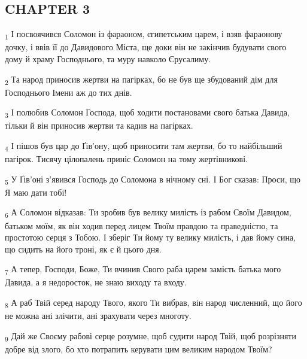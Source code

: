 \subsection{CHAPTER 3}
\begin{tcolorbox}
\textsubscript{1} І посвоячився Соломон із фараоном, єгипетським царем, і взяв фараонову дочку, і ввів її до Давидового Міста, ще доки він не закінчив будувати свого дому й храму Господнього, та муру навколо Єрусалиму.
\end{tcolorbox}
\begin{tcolorbox}
\textsubscript{2} Та народ приносив жертви на пагірках, бо не був ще збудований дім для Господнього Імени аж до тих днів.
\end{tcolorbox}
\begin{tcolorbox}
\textsubscript{3} І полюбив Соломон Господа, щоб ходити постановами свого батька Давида, тільки й він приносив жертви та кадив на пагірках.
\end{tcolorbox}
\begin{tcolorbox}
\textsubscript{4} І пішов був цар до Ґів'ону, щоб приносити там жертви, бо то найбільший пагірок. Тисячу цілопалень приніс Соломон на тому жертівникові.
\end{tcolorbox}
\begin{tcolorbox}
\textsubscript{5} У Ґів'оні з'явився Господь до Соломона в нічному сні. І Бог сказав: Проси, що Я маю дати тобі!
\end{tcolorbox}
\begin{tcolorbox}
\textsubscript{6} А Соломон відказав: Ти зробив був велику милість із рабом Своїм Давидом, батьком моїм, як він ходив перед лицем Твоїм правдою та праведністю, та простотою серця з Тобою. І зберіг Ти йому ту велику милість, і дав йому сина, що сидить на його троні, як є й цього дня.
\end{tcolorbox}
\begin{tcolorbox}
\textsubscript{7} А тепер, Господи, Боже, Ти вчинив Свого раба царем замість батька мого Давида, а я недоросток, не знаю виходу та входу.
\end{tcolorbox}
\begin{tcolorbox}
\textsubscript{8} А раб Твій серед народу Твого, якого Ти вибрав, він народ численний, що його не можна ані злічити, ані зрахувати через многоту.
\end{tcolorbox}
\begin{tcolorbox}
\textsubscript{9} Дай же Своєму рабові серце розумне, щоб судити народ Твій, щоб розрізняти добре від злого, бо хто потрапить керувати цим великим народом Твоїм?
\end{tcolorbox}
